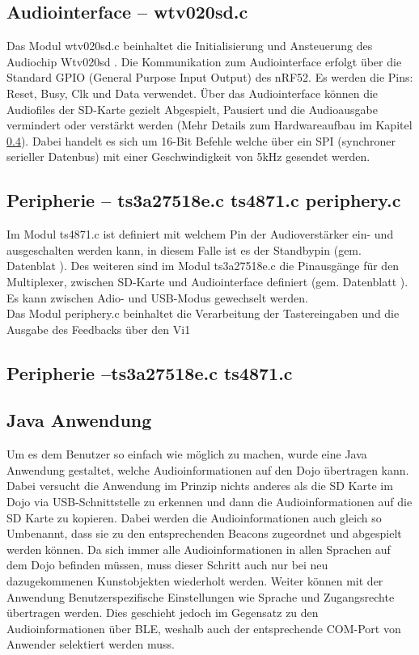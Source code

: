 \subsection{Audiointerface -- wtv020sd.c}
Das Modul wtv020sd.c beinhaltet die Initialisierung und Ansteuerung des Audiochip Wtv020sd \cite{WTV020}. Die Kommunikation zum Audiointerface erfolgt über die Standard GPIO (General Purpose Input Output) des nRF52. Es werden die Pins: Reset, Busy, Clk und Data verwendet. Über das Audiointerface können die Audiofiles der SD-Karte gezielt Abgespielt, Pausiert und die Audioausgabe vermindert oder verstärkt werden (Mehr Details zum Hardwareaufbau im Kapitel \ref{}). Dabei handelt es sich um 16-Bit Befehle welche über ein SPI (synchroner serieller Datenbus) mit einer Geschwindigkeit von 5kHz gesendet werden.

\subsection{Peripherie -- ts3a27518e.c ts4871.c periphery.c }
Im Modul ts4871.c ist definiert mit welchem Pin der Audioverstärker ein- und ausgeschalten werden kann, in diesem Falle ist es der Standbypin (gem. Datenblat \cite{TS4871}). Des weiteren sind im Modul ts3a27518e.c die Pinausgänge für den Multiplexer, zwischen SD-Karte und Audiointerface definiert (gem. Datenblatt \cite{TS3A27518E}). Es kann zwischen Adio- und USB-Modus gewechselt werden.\\
Das Modul periphery.c beinhaltet die Verarbeitung der Tastereingaben und die Ausgabe des Feedbacks über den Vi1


\subsection{Peripherie --ts3a27518e.c ts4871.c}

\subsection{Java Anwendung}

Um es dem Benutzer so einfach wie möglich zu machen, wurde eine Java Anwendung gestaltet, welche Audioinformationen auf den Dojo übertragen kann. Dabei versucht die Anwendung im Prinzip nichts anderes als die SD Karte im Dojo via USB-Schnittstelle zu erkennen und dann die Audioinformationen auf die SD Karte zu kopieren. Dabei werden die Audioinformationen auch gleich so Umbenannt, dass sie zu den entsprechenden Beacons zugeordnet und abgespielt werden können. Da sich immer alle Audioinformationen in allen Sprachen auf dem Dojo befinden müssen, muss dieser Schritt auch nur bei neu dazugekommenen Kunstobjekten wiederholt werden. Weiter können mit der Anwendung Benutzerspezifische Einstellungen wie Sprache und Zugangsrechte übertragen werden. Dies geschieht jedoch im Gegensatz zu den Audioinformationen über BLE, weshalb auch der entsprechende COM-Port von Anwender selektiert werden muss.


